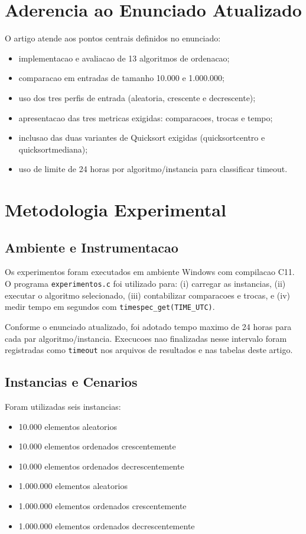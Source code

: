 \documentclass[12pt]{article}
\begin{document}
\section{Aderencia ao Enunciado Atualizado}
O artigo atende aos pontos centrais definidos no enunciado:
\begin{itemize}
\item implementacao e avaliacao de 13 algoritmos de ordenacao;
\item comparacao em entradas de tamanho 10.000 e 1.000.000;
\item uso dos tres perfis de entrada (aleatoria, crescente e decrescente);
\item apresentacao das tres metricas exigidas: comparacoes, trocas e tempo;
\item inclusao das duas variantes de Quicksort exigidas (quicksortcentro e quicksortmediana);
\item uso de limite de 24 horas por algoritmo/instancia para classificar timeout.
\end{itemize}

\section{Metodologia Experimental}
\subsection{Ambiente e Instrumentacao}
Os experimentos foram executados em ambiente Windows com compilacao C11.
O programa \texttt{experimentos.c} foi utilizado para: (i) carregar as instancias,
(ii) executar o algoritmo selecionado, (iii) contabilizar comparacoes e trocas,
e (iv) medir tempo em segundos com \texttt{timespec\_get(TIME\_UTC)}.

Conforme o enunciado atualizado, foi adotado tempo maximo de 24 horas para cada
par algoritmo/instancia. Execucoes nao finalizadas nesse intervalo foram registradas
como \texttt{timeout} nos arquivos de resultados e nas tabelas deste artigo.

\subsection{Instancias e Cenarios}
Foram utilizadas seis instancias:
\begin{itemize}
\item 10.000 elementos aleatorios
\item 10.000 elementos ordenados crescentemente
\item 10.000 elementos ordenados decrescentemente
\item 1.000.000 elementos aleatorios
\item 1.000.000 elementos ordenados crescentemente
\item 1.000.000 elementos ordenados decrescentemente
\end{itemize}
\end{document}
